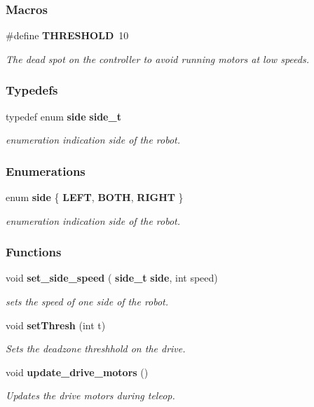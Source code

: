 \subsubsection*{Macros}
\begin{DoxyCompactItemize}
\item 
\#define \textbf{ T\+H\+R\+E\+S\+H\+O\+LD}~10
\begin{DoxyCompactList}\small\item\em The dead spot on the controller to avoid running motors at low speeds. \end{DoxyCompactList}\end{DoxyCompactItemize}
\subsubsection*{Typedefs}
\begin{DoxyCompactItemize}
\item 
typedef enum \textbf{ side} \textbf{ side\+\_\+t}
\begin{DoxyCompactList}\small\item\em enumeration indication side of the robot. \end{DoxyCompactList}\end{DoxyCompactItemize}
\subsubsection*{Enumerations}
\begin{DoxyCompactItemize}
\item 
enum \textbf{ side} \{ \textbf{ L\+E\+FT}, 
\textbf{ B\+O\+TH}, 
\textbf{ R\+I\+G\+HT}
 \}\begin{DoxyCompactList}\small\item\em enumeration indication side of the robot. \end{DoxyCompactList}
\end{DoxyCompactItemize}
\subsubsection*{Functions}
\begin{DoxyCompactItemize}
\item 
void \textbf{ set\+\_\+side\+\_\+speed} (\textbf{ side\+\_\+t} \textbf{ side}, int speed)
\begin{DoxyCompactList}\small\item\em sets the speed of one side of the robot. \end{DoxyCompactList}\item 
void \textbf{ set\+Thresh} (int t)
\begin{DoxyCompactList}\small\item\em Sets the deadzone threshhold on the drive. \end{DoxyCompactList}\item 
void \textbf{ update\+\_\+drive\+\_\+motors} ()
\begin{DoxyCompactList}\small\item\em Updates the drive motors during teleop. \end{DoxyCompactList}\end{DoxyCompactItemize}


